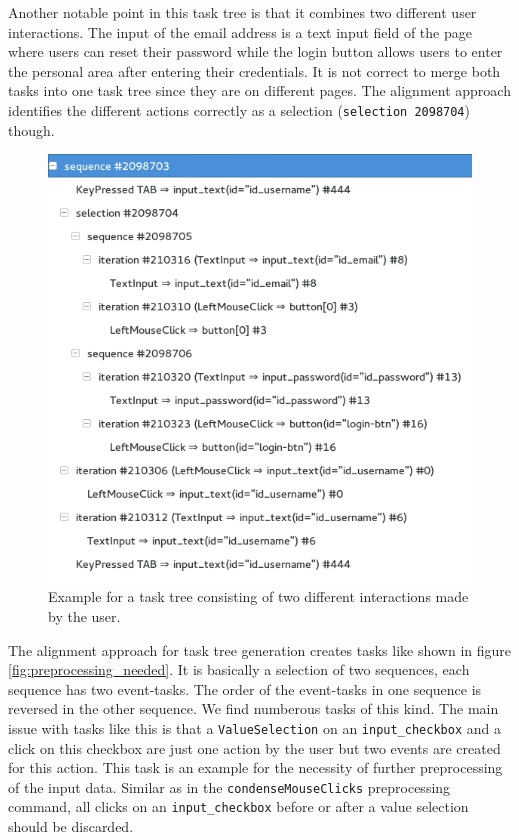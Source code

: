 Another notable point in this task tree is that it combines two different user interactions. 
The input of the email address is a text input field of the page where users can reset their password while the login button allows users to enter the personal area 
after entering their credentials. It is not correct to merge both tasks into one task tree since they are on different pages.
The alignment approach identifies the different actions correctly as a selection (\texttt{selection 2098704}) though. 

\begin{figure}[h]
	\centering
	\includegraphics[scale=0.75]{chapters/casestudy/mixedtasktree.png}
	\caption{Example for a task tree consisting of two different interactions made by the user.}
	\label{fig:mixedtasktree}
\end{figure}

The alignment approach for task tree generation creates tasks like shown in figure \ref{fig:preprocessing_needed}.
It is basically a selection of two sequences, each sequence has two event-tasks. 
The order of the event-tasks in one sequence is reversed in the other sequence.
We find numberous tasks of this kind.
The main issue with tasks like this is that a \texttt{ValueSelection} on an \texttt{input\_checkbox} and a click on this checkbox are just one action by the user but two events are created for this action.
This task is an example for the necessity of further preprocessing of the input data. 
Similar as in the \texttt{condenseMouseClicks} preprocessing command, all clicks on an \texttt{input\_checkbox} before or after a value selection should be discarded.


